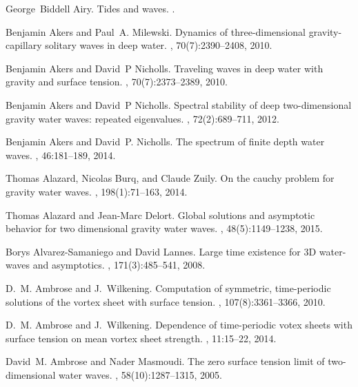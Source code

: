 \documentclass[11pt]{article}
\theoremstyle{plain}
\theoremstyle{definition}
\theoremstyle{definition}
\begin{document}
\begin{thebibliography}{10}

George~Biddell Airy.
\newblock Tides and waves.
.

Benjamin Akers and Paul~A. Milewski.
\newblock Dynamics of three-dimensional gravity-capillary solitary waves in
  deep water.
, 70(7):2390--2408, 2010.

Benjamin Akers and David~P Nicholls.
\newblock Traveling waves in deep water with gravity and surface tension.
, 70(7):2373--2389, 2010.

Benjamin Akers and David~P Nicholls.
\newblock Spectral stability of deep two-dimensional gravity water waves:
  repeated eigenvalues.
, 72(2):689--711, 2012.

Benjamin Akers and David~P. Nicholls.
\newblock The spectrum of finite depth water waves.
, 46:181--189, 2014.

Thomas Alazard, Nicolas Burq, and Claude Zuily.
\newblock On the cauchy problem for gravity water waves.
, 198(1):71--163, 2014.

Thomas Alazard and Jean-Marc Delort.
\newblock Global solutions and asymptotic behavior for two dimensional gravity
  water waves.
, 48(5):1149--1238, 2015.

Borys Alvarez-Samaniego and David Lannes.
\newblock Large time existence for 3{D} water-waves and asymptotics.
, 171(3):485--541, 2008.

D.~M. Ambrose and J.~Wilkening.
\newblock Computation of symmetric, time-periodic solutions of the vortex sheet
  with surface tension.
, 107(8):3361--3366, 2010.

D.~M. Ambrose and J.~Wilkening.
\newblock Dependence of time-periodic votex sheets with surface tension on mean
  vortex sheet strength.
, 11:15--22, 2014.

David~M. Ambrose and Nader Masmoudi.
\newblock The zero surface tension limit of two-dimensional water waves.
, 58(10):1287--1315, 2005.


\end{thebibliography}
\end{document}
